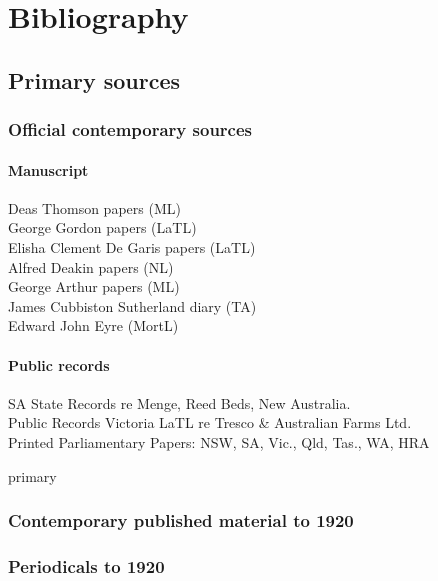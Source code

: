 
\chapter{Bibliography}



{\small 

\section*{Primary sources}

\subsection*{Official contemporary sources}

\subsubsection*{Manuscript}
Deas Thomson papers (ML)\\
George Gordon papers (LaTL)\\
Elisha Clement De Garis papers (LaTL)\\
Alfred Deakin papers (NL)\\
George Arthur papers (ML)\\
James Cubbiston Sutherland diary (TA)\\
Edward John Eyre (MortL)

\subsubsection*{Public records}
SA State Records re Menge, Reed Beds, New Australia.\\
Public Records Victoria LaTL re Tresco \& Australian Farms Ltd.\\
Printed Parliamentary Papers: NSW, SA, Vic., Qld, Tas., WA, HRA\\


\begin{btSect}{primary}
\subsection*{Contemporary published material to 1920}
\btPrintAll
\end{btSect}

\subsection*{Periodicals to 1920}

}
